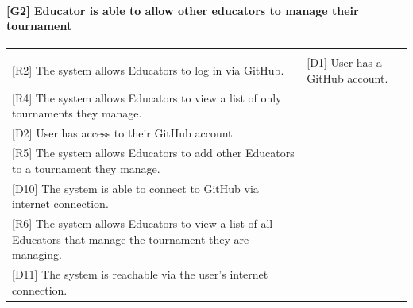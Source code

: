 \documentclass{article}
\begin{document}
\paragraph{[G2] Educator is able to allow other educators to manage their tournament}
\begin{center}
\begin{tabular}{|m{20em}|m{20em}|}
\hline
& \\
{[R2]} The system allows Educators to log in via GitHub. &
{[D1]} User has a GitHub account.\\
{[R4]} The system allows Educators to view a list of only tournaments they manage. &  \\
{[D2]} User has access to their GitHub account.\\
{[R5]} The system allows Educators to add other Educators to a tournament they manage. &  \\
{[D10]} The system is able to connect to GitHub via internet connection.\\
{[R6]} The system allows Educators to view a list of all Educators that manage the tournament they are managing. &  \\
{[D11]} The system is reachable via the user's internet connection.\\
\hline
\end{tabular}
\end{center}
\end{document}
